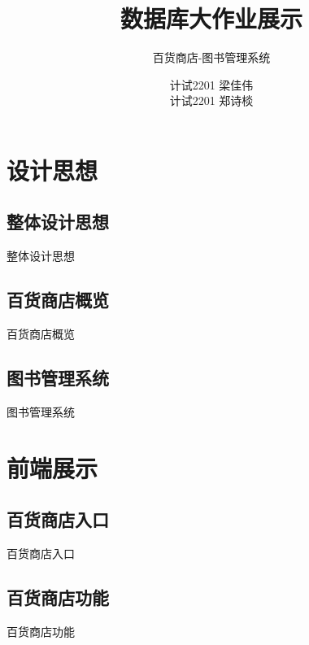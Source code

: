 \documentclass{ctexbeamer}
\title{数据库大作业展示}
\subtitle{百货商店-图书管理系统}
\author{计试2201 梁佳伟\\计试2201 郑诗棪}
\institute[Xi'an Jiaotong University]{
  西安交通大学
}
\date{}
\begin{document}
\begin{frame}
  \titlepage
\end{frame}

\section{设计思想}

\subsection{整体设计思想}
\begin{frame}{整体设计思想}

\end{frame}

\subsection{百货商店概览}
\begin{frame}{百货商店概览}
\end{frame}

\subsection{图书管理系统}
\begin{frame}{图书管理系统}
  
\end{frame}

\section{前端展示}

\subsection{百货商店入口}
\begin{frame}{百货商店入口}
  
\end{frame}

\subsection{百货商店功能}
\begin{frame}{百货商店功能}
  
\end{frame}
\end{document}
